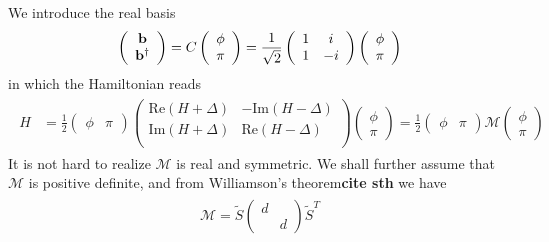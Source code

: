 We introduce the real basis 
\begin{eqnarray}\begin{aligned}
\label{Real basis}
\left(\begin{array}{ccc}
{\bf b}\\
{\bf b}^\dagger
\end{array}\right)
=C\left(\begin{array}{ccc}
\phi\\
\pi
\end{array}\right)
=\frac{1}{\sqrt{2}}\left(\begin{array}{ccc}
1 & i \\
1 & -i
\end{array}\right)\left(\begin{array}{ccc}
\phi\\
\pi
\end{array}\right)
\end{aligned}\end{eqnarray}
in which the Hamiltonian reads
\begin{eqnarray}\begin{aligned}
\hat{H}
&=\frac{1}{2}
\left(\begin{array}{ccc}
\phi & \pi
\end{array}\right)
\left(\begin{array}{ccc}
\text{Re}(H+\Delta) & -\text{Im}(H-\Delta)\\
\text{Im}(H+\Delta)& \text{Re}(H-\Delta) \\
\end{array}\right)
\left(\begin{array}{ccc}
\phi\\
\pi
\end{array}\right)
=\frac{1}{2}
\left(\begin{array}{ccc}
\phi & \pi
\end{array}\right)
\mathcal{M}
\left(\begin{array}{ccc}
\phi\\
\pi
\end{array}\right)
\end{aligned}\end{eqnarray}
It is not hard to realize $\mathcal{M}$ is real and symmetric. We shall further assume that $\mathcal{M}$ is positive definite, and from Williamson's theorem{\bf\color{red}cite sth} we have
\begin{eqnarray}\begin{aligned}
\mathcal{M}=\tilde{S}\left(\begin{array}{ccc}
d\\
&d
\end{array}\right)\tilde{S}^T
\end{aligned}\end{eqnarray}
